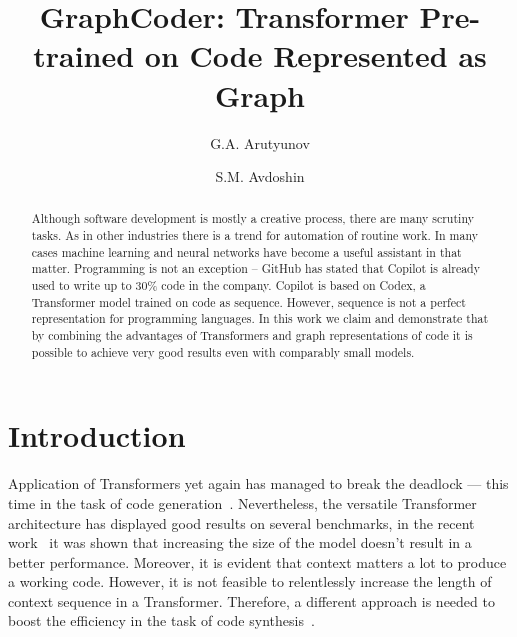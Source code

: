\documentclass[sigplan,screen,anonymous,natbib=false]{acmart}
\begin{document}
\author{G.A. Arutyunov}
\author{S.M. Avdoshin}

\title[GraphCoder]{GraphCoder: Transformer Pre-trained on Code Represented as Graph}

\begin{abstract}
    Although software development is mostly a creative process, there are many scrutiny tasks. 
    As in other industries there is a trend for automation of routine work. 
    In many cases machine learning and neural networks have become a useful assistant in that matter. 
    Programming is not an exception – GitHub has stated that Copilot is already used to write up to 30\% code in the company.
    Copilot is based on Codex, a Transformer model trained on code as sequence. 
    However, sequence is not a perfect representation for programming languages. 
    In this work we claim and demonstrate that by combining the advantages of Transformers 
    and graph representations of code it is possible to achieve very good results even with comparably small models.
\end{abstract}


\maketitle

\section{Introduction}\label{sec:introduction}

Application of Transformers yet again has managed to break the deadlock — this time in the task of code generation~\cite{hendrycks_measuring_2021,chen_evaluating_2021,li_competition-level_nodate,nijkamp_conversational_2022}.
Nevertheless, the versatile Transformer architecture has displayed good results on several benchmarks,
in the recent work~\cite{xu_systematic_2022} it was shown that increasing the size of the model doesn’t result in a better performance.
Moreover, it is evident that context matters a lot to produce a working code. 
However, it is not feasible to relentlessly increase the length of context sequence in a Transformer. 
Therefore, a different approach is needed to boost the efficiency in the task of code synthesis~\cite{arutyunov_big_2022}.
\end{document}
